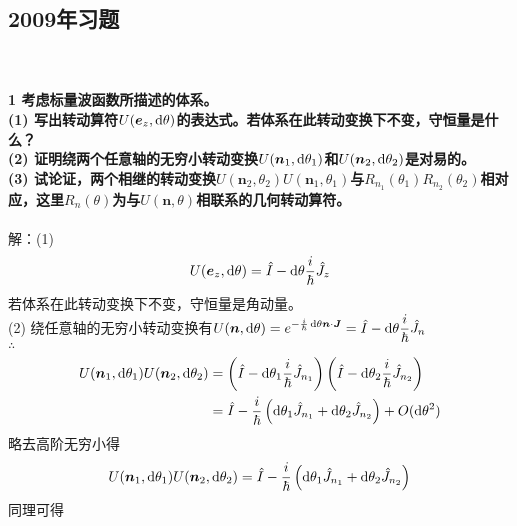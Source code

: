 \documentclass[12pt]{article}
\numberwithin{equation}{section}	 %
\begin{document}
\begin{spacing}{1.5}
\newpage
\subsection{2009年习题}
~\\
~\\
\textbf{1 \quad 考虑标量波函数所描述的体系。\\
(1) 写出转动算符$U(\bm{e}_{z},\mathop{}\!\mathrm{d}\theta)$的表达式。若体系在此转动变换下不变，守恒量是什么？\\
(2) 证明绕两个任意轴的无穷小转动变换$U(\bm{n}_{1},\mathop{}\!\mathrm{d}\theta_{1})$和$U(\bm{n}_{2},\mathop{}\!\mathrm{d}\theta_{2})$是对易的。\\
(3) 试论证，两个相继的转动变换$U(\bm{n}_{2},\theta_{2})U(\bm{n}_{1},\theta_{1})$与$R_{n_{1}}(\theta_{1})R_{n_{2}}(\theta_{2})$相对应，这里$R_{n}(\theta)$为与$U(\bm{n},\theta)$相联系的几何转动算符。
}\\
~\\
解：(1) 
\begin{equation}
U(\bm{e}_{z},\mathop{}\!\mathrm{d}\theta) = \hat{I} - \mathop{}\!\mathrm{d}\theta\frac{i}{\hbar}\hat{J}_{z}
\end{equation}
若体系在此转动变换下不变，守恒量是角动量。\\
(2) 绕任意轴的无穷小转动变换有$\displaystyle U(\bm{n},\mathop{}\!\mathrm{d}\theta) = e^{-\frac{i}{\hbar}\mathop{}\!\mathrm{d}\theta\bm{n}\cdot\bm{J}} = \hat{I} - \mathop{}\!\mathrm{d}\theta\frac{i}{\hbar}\hat{J}_{n}$\\
$\therefore$
\begin{equation}
\begin{aligned}
U(\bm{n}_{1},\mathop{}\!\mathrm{d}\theta_{1})U(\bm{n}_{2},\mathop{}\!\mathrm{d}\theta_{2}) &= \left(\hat{I} - \mathop{}\!\mathrm{d}\theta_{1}\frac{i}{\hbar}\hat{J}_{n_{1}}\right) \left(\hat{I} - \mathop{}\!\mathrm{d}\theta_{2}\frac{i}{\hbar}\hat{J}_{n_{2}}\right) \\
&= \hat{I} - \frac{i}{\hbar}\left( \mathop{}\!\mathrm{d}\theta_{1}\hat{J}_{n_{1}} + \mathop{}\!\mathrm{d}\theta_{2}\hat{J}_{n_{2}} \right) + O(\mathop{}\!\mathrm{d}\theta^{2})
\end{aligned}
\end{equation}
略去高阶无穷小得
\begin{equation}\nonumber 		%
U(\bm{n}_{1},\dif\theta_{1})U(\bm{n}_{2},\dif\theta_{2}) = \hat{I} - \frac{i}{\hbar}\left( \dif\theta_{1}\hat{J}_{n_{1}} + \dif\theta_{2}\hat{J}_{n_{2}} \right)
\end{equation}
同理可得
\begin{equation}\nonumber 		%

\end{equation}
\end{spacing}
\end{document}
